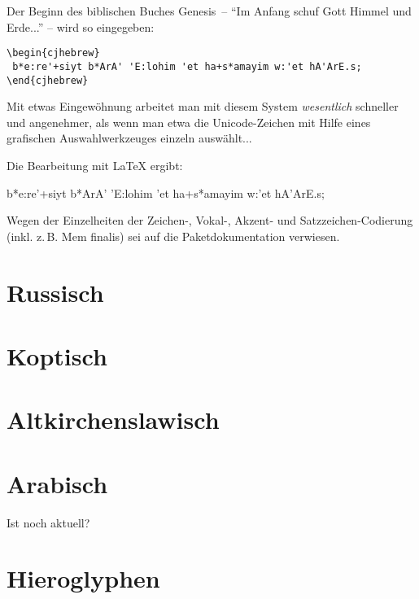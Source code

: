 Der Beginn des biblischen Buches Genesis~-- \enquote{Im Anfang schuf Gott Himmel und Erde...} --
wird so eingegeben:

\begin{lstlisting}
\begin{cjhebrew}
 b*e:re'+siyt b*ArA' 'E:lohim 'et ha+s*amayim w:'et hA'ArE.s;
\end{cjhebrew}
\end{lstlisting}

Mit etwas Eingewöhnung arbeitet man mit diesem System \emph{wesentlich} schneller und
angenehmer, als wenn man etwa die Unicode-Zeichen mit Hilfe eines grafischen Auswahlwerkzeuges
einzeln auswählt...

Die Bearbeitung mit \LaTeX{} ergibt:

\begin{cjhebrew}
 b*e:re'+siyt b*ArA' 'E:lohim 'et ha+s*amayim w:'et hA'ArE.s;
\end{cjhebrew}

Wegen der Einzelheiten der Zeichen-, Vokal-, Akzent- und Satzzeichen-Codierung (inkl. z.\,B.
Mem finalis) sei auf die Paketdokumentation verwiesen.

\section{Russisch}

\section{Koptisch}

\section{Altkirchenslawisch}



\section{Arabisch}

Ist  noch aktuell?

\section{Hieroglyphen}


